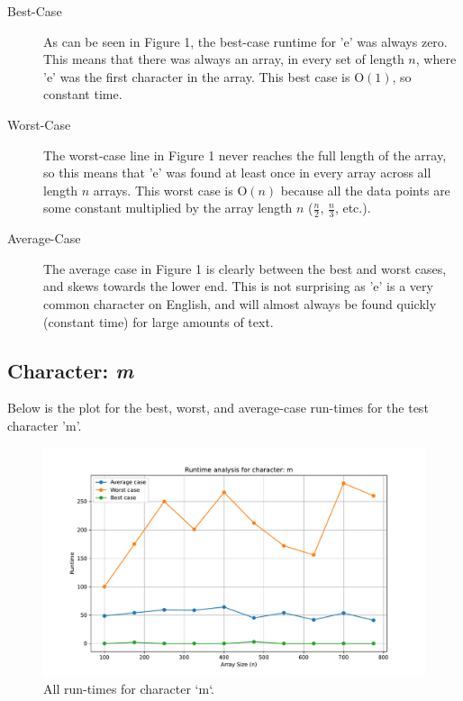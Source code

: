 \documentclass{article}
\begin{document}
\begin{description}
    \item[Best-Case] As can be seen in Figure 1, the best-case runtime for 'e' was always zero. This means that there was always an array, in every set of length $n$, where 'e' was the first character in the array. This best case is O$(1)$, so constant time.
    \item[Worst-Case] The worst-case line in Figure 1 never reaches the full length of the array, so this means that 'e' was found at least once in every array across all length $n$ arrays. This worst case is O$(n)$ because all the data points are some constant multiplied by the array length $n$ ($\frac{n}{2}$, $\frac{n}{3}$, etc.).
    \item[Average-Case] The average case in Figure 1 is clearly between the best and worst cases, and skews towards the lower end. This is not surprising as 'e' is a very common character on English, and will almost always be found quickly (constant time) for large amounts of text. 
\end{description}

\subsection{Character: \textit{m}}
Below is the plot for the best, worst, and average-case run-times for the test character 'm'.
	
	\begin{figure}[H]
		\centering
		\includegraphics[width=\textwidth]{runtime_analysis_m.pdf}
		\caption{All run-times for character `m`.}
	\end{figure}
\end{document}
